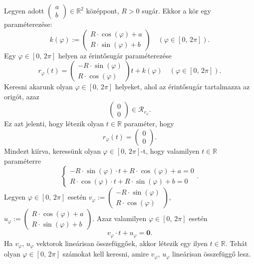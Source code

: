 \documentclass[12pt]{article}
\newcommand{\R}{\mathbb{R}}
\begin{document}
    \newpage
    Legyen adott $\begin{pmatrix}
        a \\
        b
    \end{pmatrix} \in \R^2$ középpont, $R > 0$ sugár. Ekkor a kör egy paraméterezése:
    \[
        k(\varphi) := \begin{pmatrix}
            R \cdot \cos(\varphi) + a \\
            R \cdot \sin(\varphi) + b
        \end{pmatrix} \quad (\varphi \in [0, \, 2 \pi]).
    \]
    Egy $\varphi \in [0, \, 2 \pi]$ helyen az érintősugár paraméterezése
    \[
        r_\varphi(t) = \begin{pmatrix}
            - R \cdot \sin(\varphi) \\
            R \cdot \cos(\varphi)
        \end{pmatrix} t + k(\varphi) \quad (\varphi \in [0, \, 2 \pi]).
    \]
    Keresni akarunk olyan $\varphi \in [0, \, 2 \pi]$ helyeket, ahol az érintősugár tartalmazza az origót, azaz
    \[
        \begin{pmatrix}
            0\\
            0
        \end{pmatrix}\in
        \mathcal{R}_{r_\varphi}.
    \]
    Ez azt jelenti, hogy létezik olyan $t \in \R$ paraméter, hogy
    \[
        r_\varphi(t) = \begin{pmatrix}
            0\\
            0
        \end{pmatrix}.
    \]
    Mindezt kiírva, keressünk olyan $\varphi \in [0, \, 2 \pi]$-t, hogy valamilyen $t \in \R$ paraméterre
    \begin{equation*}
        \begin{cases}
            -R \cdot \sin(\varphi) \cdot t + R \cdot \cos(\varphi) + a = 0 \\
            R \cdot \cos(\varphi) \cdot t + R \cdot \sin(\varphi) + b = 0
        \end{cases}.
    \end{equation*}
    Legyen $\varphi \in [0, \, 2 \pi]$ esetén $v_\varphi := \begin{pmatrix}
        -R \cdot \sin(\varphi) \\
        R \cdot \cos(\varphi)
    \end{pmatrix}$, $u_\varphi := \begin{pmatrix}
        R \cdot \cos(\varphi) + a \\
        R \cdot \sin(\varphi) + b
    \end{pmatrix}$.
    Azaz valamilyen $\varphi \in [0, \, 2 \pi]$ esetén
    \[
        v_\varphi \cdot t + u_\varphi = \mathbf{0}.
    \]
    Ha $v_\varphi, \, u_\varphi$ vektorok lineárisan összefüggőek, akkor létezik egy ilyen $t \in \R$. Tehát olyan $\varphi \in [0, \, 2 \pi]$ számokat kell keresni, amire $v_\varphi, \, u_\varphi$ lineárisan összefüggő lesz.

    
        
        
    
\end{document}
